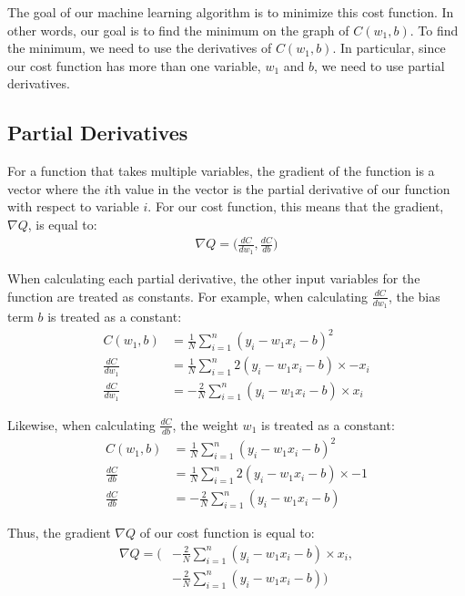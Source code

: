 \documentclass[12pt]{article}
\begin{document}
The goal of our machine learning algorithm is to minimize this cost function. In other words, our goal is to find the minimum on the graph of $C(w_1, b)$. To find the minimum, we need to use the derivatives of $C(w_1, b)$. In particular, since our cost function has more than one variable, $w_1$ and $b$, we need to use partial derivatives.

\subsection*{Partial Derivatives}

For a function that takes multiple variables, the gradient of the function is a vector where the $i$th value in the vector is the partial derivative of our function with respect to variable $i$. For our cost function, this means that the gradient, $\nabla Q$, is equal to:
\begin{align*}
	\nabla Q = \Big(\frac{dC}{dw_1}, \frac{dC}{db}\Big)
\end{align*}

When calculating each partial derivative, the other input variables for the function are treated as constants. For example, when calculating $\frac{dC}{dw_1}$, the bias term $b$ is treated as a constant:
\begin{align*}
	C(w_1, b)       & = \frac{1}{N} \sum_{i=1}^{n} (y_i - w_1x_i - b)^2
	\\
	\frac{dC}{dw_1} & = \frac{1}{N} \sum_{i=1}^{n} 2(y_i - w_1x_i - b) \times -x_i
	\\
	\frac{dC}{dw_1} & = -\frac{2}{N} \sum_{i=1}^{n} (y_i - w_1x_i - b) \times x_i
\end{align*}

Likewise, when calculating $\frac{dC}{db}$, the weight $w_1$ is treated as a constant:
\begin{align*}
	C(w_1, b)     & = \frac{1}{N} \sum_{i=1}^{n} (y_i - w_1x_i - b)^2
	\\
	\frac{dC}{db} & = \frac{1}{N} \sum_{i=1}^{n} 2(y_i - w_1x_i - b) \times -1
	\\
	\frac{dC}{db} & = -\frac{2}{N} \sum_{i=1}^{n} (y_i - w_1x_i - b)
\end{align*}

Thus, the gradient $\nabla Q$ of our cost function is equal to:
\begin{align*}
	\nabla Q = \Big(
	 &
	-\frac{2}{N} \sum_{i=1}^{n} (y_i - w_1x_i - b) \times x_i,
	\\
	 & -\frac{2}{N} \sum_{i=1}^{n} (y_i - w_1x_i - b)
	\Big)
\end{align*}
\end{document}
